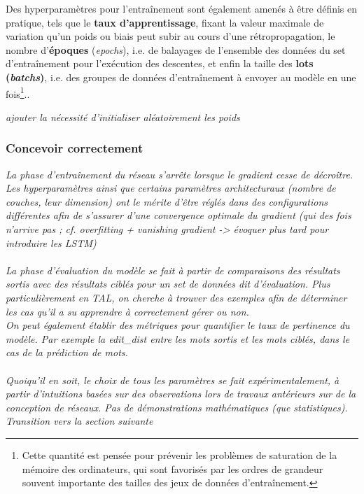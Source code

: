 \documentclass[12pt, french, twoside]{report}
\begin{document}
Des hyperparamètres pour l'entraînement sont également amenés à être définis en pratique, tels que le \textbf{taux d'apprentissage}, fixant la valeur maximale de variation qu'un poids ou biais peut subir au cours d'une rétropropagation, le nombre d'\textbf{époques} (\textit{epochs}), i.e. de balayages de l'ensemble des données du set d'entraînement pour l'exécution des descentes, et enfin la taille des \textbf{lots (\textit{batchs})}, i.e. des groupes de données d'entraînement à envoyer au modèle en une fois\footnote{Cette quantité est pensée pour prévenir les problèmes de saturation de la mémoire des ordinateurs, qui sont favorisés par les ordres de grandeur souvent importante des tailles des jeux de données d'entraînement.}.\citep[chap.~7, p.~17-23]{jurafsky}.\citep[21]{fourrier}

\textit{ajouter la nécessité d'initialiser aléatoirement les poids}

\subsubsection{Concevoir correctement}

\textit{
    La phase d'entraînement du réseau s'arrête lorsque le gradient cesse de décroître.\\
    Les hyperparamètres ainsi que certains paramètres architecturaux (nombre de couches, leur dimension) ont le mérite d'être réglés dans des configurations différentes afin de s'assurer d'une convergence optimale du gradient (qui des fois n'arrive pas ; cf. overfitting + vanishing gradient -> évoquer plus tard pour introduire les LSTM)\\
    \\
    La phase d'évaluation du modèle se fait à partir de comparaisons des résultats sortis avec des résultats ciblés pour un set de données dit d'évaluation. Plus particulièrement en TAL, on cherche à trouver des exemples afin de déterminer les cas qu'il a su apprendre à correctement gérer ou non.\\
    On peut également établir des métriques pour quantifier le taux de pertinence du modèle.
    Par exemple la \gls{edit_dist} entre les mots sortis et les mots ciblés, dans le cas de la prédiction de mots.\\
    \\
    Quoiqu'il en soit, le choix de tous les paramètres se fait expérimentalement, à partir d'intuitions basées sur des observations lors de travaux antérieurs sur de la conception de réseaux. Pas de démonstrations mathématiques (que statistiques).\\
    Transition vers la section suivante
    }
\end{document}
